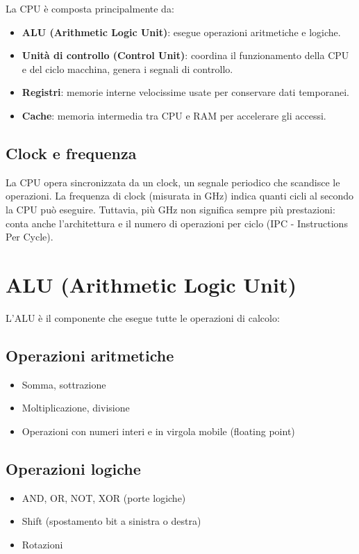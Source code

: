 \documentclass[12pt,a4paper]{article}
\begin{document}
La CPU è composta principalmente da:
\begin{itemize}
    \item \textbf{ALU (Arithmetic Logic Unit)}: esegue operazioni aritmetiche e logiche.
    \item \textbf{Unità di controllo (Control Unit)}: coordina il funzionamento della CPU e del ciclo macchina, genera i segnali di controllo.
    \item \textbf{Registri}: memorie interne velocissime usate per conservare dati temporanei.
    \item \textbf{Cache}: memoria intermedia tra CPU e RAM per accelerare gli accessi.
\end{itemize}

\subsection{Clock e frequenza}
La CPU opera sincronizzata da un clock, un segnale periodico che scandisce le operazioni. La frequenza di clock (misurata in GHz) indica quanti cicli al secondo la CPU può eseguire. Tuttavia, più GHz non significa sempre più prestazioni: conta anche l'architettura e il numero di operazioni per ciclo (IPC - Instructions Per Cycle).

\section{ALU (Arithmetic Logic Unit)}
L'ALU è il componente che esegue tutte le operazioni di calcolo:

\subsection{Operazioni aritmetiche}
\begin{itemize}
    \item Somma, sottrazione
    \item Moltiplicazione, divisione
    \item Operazioni con numeri interi e in virgola mobile (floating point)
\end{itemize}

\subsection{Operazioni logiche}
\begin{itemize}
    \item AND, OR, NOT, XOR (porte logiche)
    \item \texorpdfstring{\colorbox{gray!50}{Shift (spostamento bit a sinistra o destra)}}{}
    \item \texorpdfstring{\colorbox{gray!50}{Rotazioni}}{}
\end{itemize}
\end{document}
